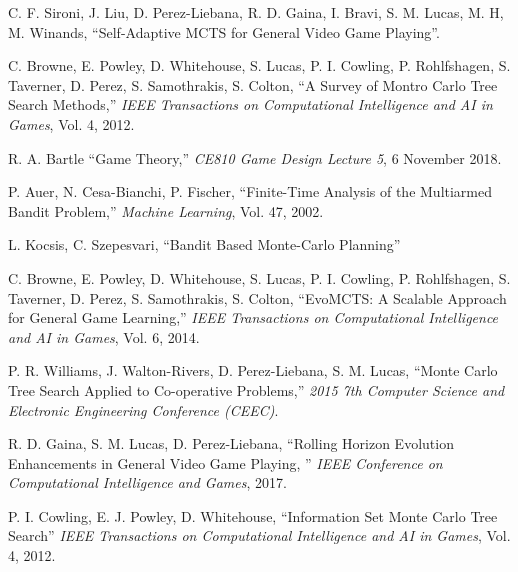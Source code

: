 \begin{thebibliography}{9}

C. F. Sironi, J. Liu, D. Perez-Liebana, R. D. Gaina, I. Bravi, S. M. Lucas, M. H, M. Winands, ``Self-Adaptive MCTS for General Video Game Playing''. 

C. Browne, E. Powley, D. Whitehouse, S. Lucas, P. I. Cowling, P. Rohlfshagen, S. Taverner, D. Perez, S. Samothrakis, S. Colton,  
``A Survey of Montro Carlo Tree Search Methods,'' 
{\em IEEE Transactions on Computational Intelligence and AI in Games}, Vol. 4, 2012.

R. A. Bartle ``Game Theory,'' {\em CE810 Game Design Lecture 5}, 6 November 2018. 

P. Auer, N. Cesa-Bianchi, P. Fischer, ``Finite-Time Analysis of the Multiarmed Bandit Problem,'' {\em Machine Learning}, Vol. 47, 2002.

L. Kocsis, C. Szepesvari, ``Bandit Based Monte-Carlo Planning'' 

C. Browne, E. Powley, D. Whitehouse, S. Lucas, P. I. Cowling, P. Rohlfshagen, S. Taverner, D. Perez, S. Samothrakis, S. Colton,  
``EvoMCTS: A Scalable Approach for General Game Learning,'' 
{\em IEEE Transactions on Computational Intelligence and AI in Games}, Vol. 6, 2014.

P. R. Williams, J. Walton-Rivers, D. Perez-Liebana, S. M. Lucas, ``Monte Carlo Tree Search Applied to Co-operative Problems,'' {\em 2015 7th Computer Science and Electronic Engineering Conference (CEEC)}.

R. D. Gaina, S. M. Lucas, D. Perez-Liebana, ``Rolling Horizon Evolution Enhancements in General Video Game Playing, '' {\em IEEE Conference on Computational Intelligence and Games}, 2017.

P. I. Cowling, E. J. Powley, D. Whitehouse, 
``Information Set Monte Carlo Tree Search'' 
{\em IEEE Transactions on Computational Intelligence and AI in Games}, Vol. 4, 2012.


\end{thebibliography}

